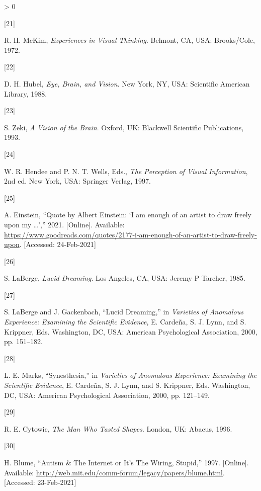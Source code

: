 \documentclass[
  11pt,
  a4paper,
]{article}
\newlength{\cslhangindent}
\newlength{\csllabelwidth}
\newenvironment{CSLReferences}[2] %
 {%
  \setlength{\parindent}{0pt}
  \ifodd #1 \everypar{\setlength{\hangindent}{\cslhangindent}}\ignorespaces\fi
  \ifnum #2 > 0
  \setlength{\parskip}{#2\baselineskip}
  \fi
 }%
 {}
\newcommand{\CSLLeftMargin}[1]{\parbox[t]{\csllabelwidth}{#1}}
\newcommand{\CSLRightInline}[1]{\parbox[t]{\linewidth - \csllabelwidth}{#1}\break}
\begin{document}
\begin{CSLReferences}{0}{0}
\leavevmode\hypertarget{ref-mckim72}{}%
\CSLLeftMargin{{[}21{]} }
\CSLRightInline{R. H. McKim, \emph{{Experiences in Visual Thinking}}.
Belmont, CA, USA: Brooks/Cole, 1972. }

\leavevmode\hypertarget{ref-hubel88}{}%
\CSLLeftMargin{{[}22{]} }
\CSLRightInline{D. H. Hubel, \emph{{Eye, Brain, and Vision}}. New York,
NY, USA: Scientific American Library, 1988. }

\leavevmode\hypertarget{ref-zeki93}{}%
\CSLLeftMargin{{[}23{]} }
\CSLRightInline{S. Zeki, \emph{{A Vision of the Brain}}. Oxford, UK:
Blackwell Scientific Publications, 1993. }

\leavevmode\hypertarget{ref-pvi97}{}%
\CSLLeftMargin{{[}24{]} }
\CSLRightInline{W. R. Hendee and P. N. T. Wells, Eds., \emph{{The
Perception of Visual Information}}, 2nd ed. New York, USA: Springer
Verlag, 1997. }

\leavevmode\hypertarget{ref-einstein-quote}{}%
\CSLLeftMargin{{[}25{]} }
\CSLRightInline{A. Einstein, {``{Quote by Albert Einstein: {`I am enough
of an artist to draw freely upon my \ldots{}'}},''} 2021. {[}Online{]}.
Available:
\url{https://www.goodreads.com/quotes/2177-i-am-enough-of-an-artist-to-draw-freely-upon}.
{[}Accessed: 24-Feb-2021{]}}

\leavevmode\hypertarget{ref-laberge85}{}%
\CSLLeftMargin{{[}26{]} }
\CSLRightInline{S. LaBerge, \emph{{Lucid Dreaming}}. Los Angeles, CA,
USA: Jeremy P Tarcher, 1985. }

\leavevmode\hypertarget{ref-laberge2000}{}%
\CSLLeftMargin{{[}27{]} }
\CSLRightInline{S. LaBerge and J. Gackenbach, {``{Lucid Dreaming},''} in
\emph{{Varieties of Anomalous Experience: Examining the Scientific
Evidence}}, E. Cardeña, S. J. Lynn, and S. Krippner, Eds. Washington,
DC, USA: American Psychological Association, 2000, pp. 151--182. }

\leavevmode\hypertarget{ref-marks00}{}%
\CSLLeftMargin{{[}28{]} }
\CSLRightInline{L. E. Marks, {``Synesthesia,''} in \emph{{Varieties of
Anomalous Experience: Examining the Scientific Evidence}}, E. Cardeña,
S. J. Lynn, and S. Krippner, Eds. Washington, DC, USA: American
Psychological Association, 2000, pp. 121--149. }

\leavevmode\hypertarget{ref-cytowic96}{}%
\CSLLeftMargin{{[}29{]} }
\CSLRightInline{R. E. Cytowic, \emph{{The Man Who Tasted Shapes}}.
London, UK: Abacus, 1996. }

\leavevmode\hypertarget{ref-blume04}{}%
\CSLLeftMargin{{[}30{]} }
\CSLRightInline{H. Blume, {``{Autism \& The Internet or It's The Wiring,
Stupid},''} 1997. {[}Online{]}. Available:
\url{http://web.mit.edu/comm-forum/legacy/papers/blume.html}.
{[}Accessed: 23-Feb-2021{]}}


\end{CSLReferences}
\end{document}
